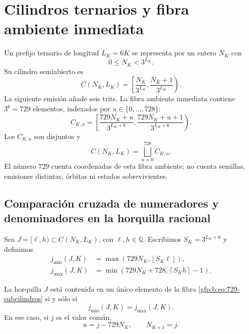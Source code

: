 \section{Cilindros ternarios y fibra ambiente inmediata}

Un prefijo ternario de longitud \(L_K=6K\) se representa por un entero
\(N_K\) con
\[
 0\leq N_K<3^{L_K}.
\]
Su cilindro semiabierto es
\begin{equation}
 C(N_K,L_K)=
 \left[
 \frac{N_K}{3^{L_K}},
 \frac{N_K+1}{3^{L_K}}
 \right).
 \label{gfp:b:eq:cilindro-nivel-K}
\end{equation}
La siguiente emisión añade seis trits. La fibra ambiente inmediata contiene
\(3^6=729\) elementos, indexados por \(u\in\{0,\ldots,728\}\):
\begin{equation}
 C_{K,u}=
 \left[
 \frac{729N_K+u}{3^{L_K+6}},
 \frac{729N_K+u+1}{3^{L_K+6}}
 \right).
 \label{gfp:b:eq:729-subcilindros}
\end{equation}
Los \(C_{K,u}\) son disjuntos y
\[
 C(N_K,L_K)=\bigsqcup_{u=0}^{728}C_{K,u}.
\]
El número \(729\) cuenta coordenadas de esta fibra ambiente; no cuenta
semillas, emisiones distintas, órbitas ni estados sobrevivientes.

\subsection{Comparación cruzada de numeradores y denominadores en la horquilla racional}

Sea \(J=[\ell,h)\subset C(N_K,L_K)\), con
\(\ell,h\in\mathbb Q\). Escribimos \(S_K=3^{L_K+6}\) y definimos
\begin{align}
 j_{\min}(J,K)
 &=\max\!\left(729N_K,\left\lfloor S_K\ell\right\rfloor\right),
 \label{gfp:b:eq:jmin-diagonal}\\
 j_{\max}(J,K)
 &=\min\!\left(729N_K+728,\left\lceil S_Kh\right\rceil-1\right).
 \label{gfp:b:eq:jmax-diagonal}
\end{align}

\begin{lemma}
\label{gfp:b:lem:criterio-localizacion-unitaria}
La horquilla \(J\) está contenida en un único elemento de la fibra
\eqref{gfp:b:eq:729-subcilindros} si y sólo si
\begin{equation}
 \boxed{j_{\min}(J,K)=j_{\max}(J,K).}
 \label{gfp:b:eq:jmin-igual-jmax}
\end{equation}
En ese caso, si \(j\) es el valor común,
\[
 u=j-729N_K,
 \qquad
 N_{K+1}=j.
\]
\end{lemma}


